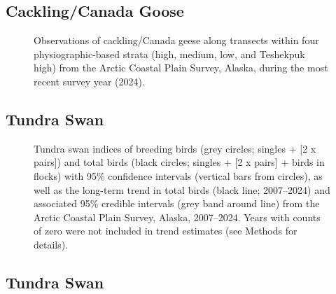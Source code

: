 \documentclass[
]{article}
\begin{document}
\endgroup{}

\newpage{}

\subsection*{Cackling/Canada Goose}\label{cacklingcanada-goose-2}

\begin{figure}


\caption{\label{fig-CCGOmap}Observations of cackling/Canada geese along
transects within four physiographic-based strata (high, medium, low, and
Teshekpuk high) from the Arctic Coastal Plain Survey, Alaska, during the
most recent survey year (2024).}

\end{figure}%

\newpage{}

\subsection*{Tundra Swan}\label{tundra-swan}

\begin{figure}


\caption{\label{fig-SWAN}Tundra swan indices of breeding birds (grey
circles; singles + {[}2 x pairs{]}) and total birds (black circles;
singles + {[}2 x pairs{]} + birds in flocks) with 95\% confidence
intervals (vertical bars from circles), as well as the long-term trend
in total birds (black line; 2007--2024) and associated 95\% credible
intervals (grey band around line) from the Arctic Coastal Plain Survey,
Alaska, 2007--2024. Years with counts of zero were not included in trend
estimates (see Methods for details).}

\end{figure}%

\newpage{}

\subsection*{Tundra Swan}\label{tundra-swan-1}
\end{document}
